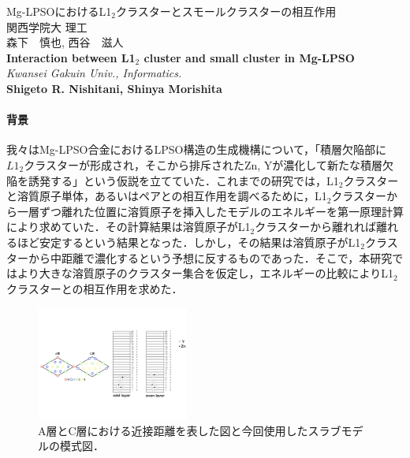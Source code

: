 \documentclass[12pt,a4paper,dvipdfmx]{jsarticle}
\begin{document}
\vspace{-5pt}
\begin{center}
{\gt \Large Mg-LPSOにおけるL1$_2$クラスターとスモールクラスターの相互作用}\\[10pt]

{\gt \large 関西学院大 理工 \\森下　慎也, 西谷　滋人}\\[5pt]

{\large \bf Interaction between L1$_2$ cluster and small cluster in Mg-LPSO}\\[5pt]

{\large \it Kwansei Gakuin Univ., Informatics.}\\ 

{\large \bf Shigeto R. Nishitani, Shinya Morishita}
\end{center}

\vspace{10pt}
\paragraph{背景}
我々はMg-LPSO合金におけるLPSO構造の生成機構について，「積層欠陥部に$L1_2$クラスターが形成され，そこから排斥されたZn, Yが濃化して新たな積層欠陥を誘発する」という仮説を立てていた\cite{sakamoto}．これまでの研究では，L1$_2$クラスターと溶質原子単体，あるいはペアとの相互作用を調べるために，L1$_2$クラスターから一層ずつ離れた位置に溶質原子を挿入したモデルのエネルギーを第一原理計算により求めていた．その計算結果は溶質原子がL1$_2$クラスターから離れれば離れるほど安定するという結果となった．しかし，その結果は溶質原子がL1$_2$クラスターから中距離で濃化するという予想に反するものであった．そこで，本研究ではより大きな溶質原子のクラスター集合を仮定し，エネルギーの比較によりL1$_2$クラスターとの相互作用を求めた．
\begin{figure}
\vspace{-1.4\baselineskip}
\begin{center}
   \includegraphics[width=50mm]{slab24_color.jpeg}
  \caption{A層とC層における近接距離を表した図と今回使用したスラブモデルの模式図．}
  \label{fig:one}
\end{center}
\vspace{-1\baselineskip}
\end{figure}
\vspace{-1\baselineskip}
\end{document}
